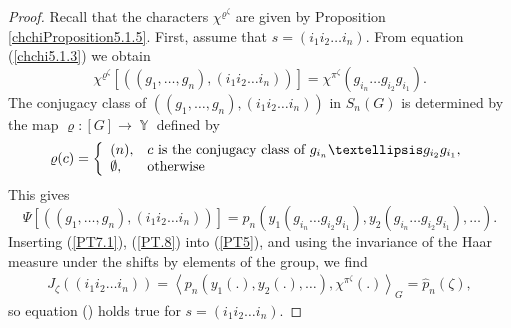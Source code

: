 \documentclass[10pt,a4paper]{amsart}
\DeclareMathOperator{\Y}{\mathbb{Y}}
\begin{document}
\begin{proof}
Recall that the characters $\chi^{\varrho^{\zeta}}$ are given by Proposition \ref{chchiProposition5.1.5}. First, assume that $s=(i_1i_2\ldots i_n)$. From equation
(\ref{chchi5.1.3}) we obtain
\begin{equation}\label{PT7.1}
\chi^{\varrho^{\zeta}}\left[\left((g_1,\ldots,g_n),(i_1i_2\ldots i_n)\right)\right]
=\chi^{\pi^{\zeta}}\left(g_{i_n}\ldots g_{i_2}g_{i_1}\right).
\end{equation}
The conjugacy class of $\left((g_1,\ldots,g_n),(i_1i_2\ldots i_n)\right)$ in $S_n(G)$
is determined by the map $\varrho: [G]\longrightarrow\Y$ defined by
$$
\varrho(c)=\left\{
  \begin{array}{ll}
    (n), & \hbox{$c$ is the conjugacy class of $g_{i_n}\ldots g_{i_2}g_{i_1}$}, \\
    \emptyset, & \hbox{otherwise}
  \end{array}
\right.
$$
This gives
\begin{equation}\label{PT.8}
\Psi\left[\left((g_1,\ldots,g_n),(i_1i_2\ldots i_n)\right)\right]=p_n\left(y_1(g_{i_n}\ldots g_{i_2}g_{i_1}),
y_2(g_{i_n}\ldots g_{i_2}g_{i_1}),\ldots\right).
\end{equation}
Inserting (\ref{PT7.1}), (\ref{PT.8}) into (\ref{PT5}), and
using the invariance of the Haar measure under the shifts by elements of the group, we find
\begin{equation}
\begin{split}
J_{\zeta}\left((i_1i_2\ldots i_n)\right)=\left<p_n\left(y_1(.),y_2(.),\ldots\right),
\chi^{\pi^{\zeta}}(.)\right>_{G}
=\widehat{p}_n(\zeta),
\end{split}
\end{equation}
so equation () holds true for $s=(i_1i_2\ldots i_n)$.


\end{proof}
\end{document}
